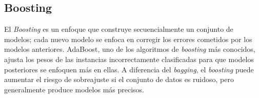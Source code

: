 \subsection{Boosting}
El \textit{Boosting} es un enfoque que construye secuencialmente un conjunto de modelos; cada nuevo modelo se enfoca en corregir los errores cometidos por los modelos anteriores. AdaBoost, uno de los algoritmos de \textit{boosting} más conocidos, ajusta los pesos de las instancias incorrectamente clasificadas para que modelos posteriores se enfoquen más en ellas. A diferencia del \textit{bagging}, el \textit{boosting} puede aumentar el riesgo de sobreajuste si el conjunto de datos es ruidoso, pero generalmente produce modelos más precisos.
